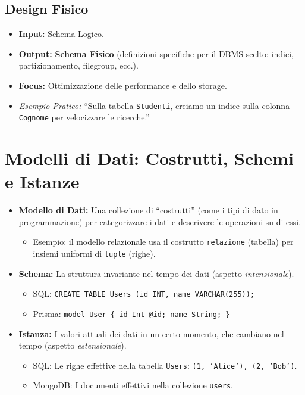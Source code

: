 \documentclass{article}
\begin{document}
	\subsection{Design Fisico}
	\begin{itemize}
		\item \textbf{Input:} Schema Logico.
		\item \textbf{Output:} \textbf{Schema Fisico} (definizioni specifiche per il DBMS scelto: indici, partizionamento, filegroup, ecc.).
		\item \textbf{Focus:} Ottimizzazione delle performance e dello storage.
		\item \textit{Esempio Pratico:} ``Sulla tabella \texttt{Studenti}, creiamo un indice sulla colonna \texttt{Cognome} per velocizzare le ricerche.''
	\end{itemize}
	
	\section{Modelli di Dati: Costrutti, Schemi e Istanze}
	\begin{itemize}
		\item \textbf{Modello di Dati:} Una collezione di ``costrutti'' (come i tipi di dato in programmazione) per categorizzare i dati e descrivere le operazioni su di essi.
		\begin{itemize}
			\item Esempio: il modello relazionale usa il costrutto \texttt{relazione} (tabella) per insiemi uniformi di \texttt{tuple} (righe).
		\end{itemize}
		\item \textbf{Schema:} La struttura invariante nel tempo dei dati (aspetto \textit{intensionale}).
		\begin{itemize}
			\item SQL: \texttt{CREATE TABLE Users (id INT, name VARCHAR(255));}
			\item Prisma: \texttt{model User \{ id Int @id; name String; \}}
		\end{itemize}
		\item \textbf{Istanza:} I valori attuali dei dati in un certo momento, che cambiano nel tempo (aspetto \textit{estensionale}).
		\begin{itemize}
			\item SQL: Le righe effettive nella tabella \texttt{Users}: \texttt{(1, 'Alice'), (2, 'Bob')}.
			\item MongoDB: I documenti effettivi nella collezione \texttt{users}.
		\end{itemize}
	\end{itemize}
	
\end{document}
